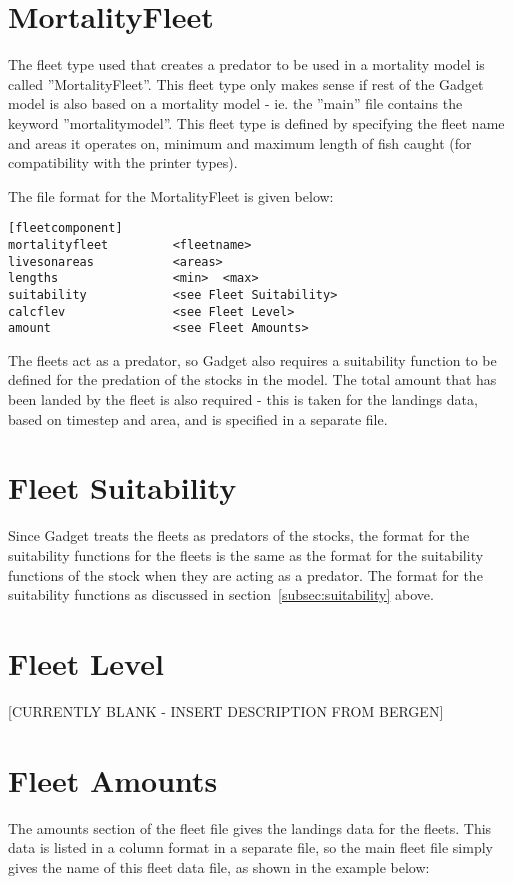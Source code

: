 \documentclass [a4paper, 10pt]{book}
\begin{document}
\section{MortalityFleet}\label{sec:mortalityfleet}
The fleet type used that creates a predator to be used in a mortality model is called ''MortalityFleet''.  This fleet type only makes sense if rest of the Gadget model is also based on a mortality model - ie. the ''main'' file contains the keyword ''mortalitymodel''.  This fleet type is defined by specifying the fleet name and areas it operates on, minimum and maximum length of fish caught (for compatibility with the printer types).

\bigskip
The file format for the MortalityFleet is given below:

{\small\begin{verbatim}
[fleetcomponent]
mortalityfleet         <fleetname>
livesonareas           <areas>
lengths                <min>  <max>
suitability            <see Fleet Suitability>
calcflev               <see Fleet Level>
amount                 <see Fleet Amounts>
\end{verbatim}}

The fleets act as a predator, so Gadget also requires a suitability function to be defined for the predation of the stocks in the model.  The total amount that has been landed by the fleet is also required - this is taken for the landings data, based on timestep and area, and is specified in a separate file.

\section{Fleet Suitability}\label{sec:fleetsuit}
Since Gadget treats the fleets as predators of the stocks, the format for the suitability functions for the fleets is the same as the format for the suitability functions of the stock when they are acting as a predator.  The format for the suitability functions as discussed in section~\ref{subsec:suitability} above.

\section{Fleet Level}\label{sec:fleetlevel}
[CURRENTLY BLANK - INSERT DESCRIPTION FROM BERGEN]

\section{Fleet Amounts}\label{sec:fleetamount}
The amounts section of the fleet file gives the landings data for the fleets.  This data is listed in a column format in a separate file, so the main fleet file simply gives the name of this fleet data file, as shown in the example below:
\end{document}
